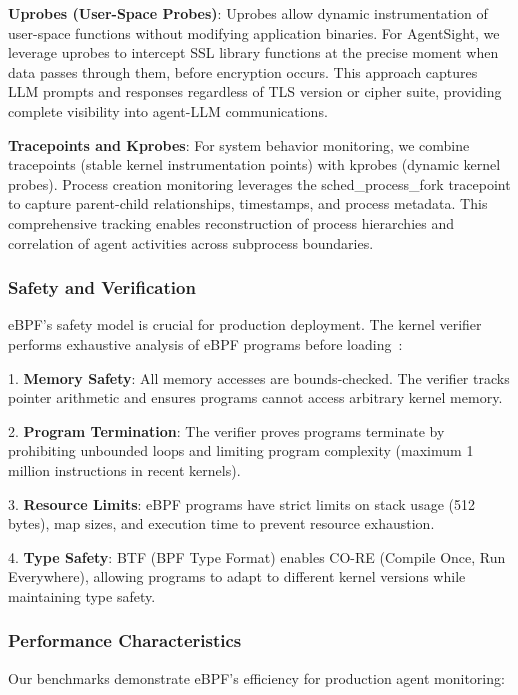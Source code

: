 \documentclass[sigplan,screen，review,9pt]{acmart}
\begin{document}
\textbf{Uprobes (User-Space Probes)}: Uprobes allow dynamic instrumentation of user-space functions without modifying application binaries. For AgentSight, we leverage uprobes to intercept SSL library functions at the precise moment when data passes through them, before encryption occurs. This approach captures LLM prompts and responses regardless of TLS version or cipher suite, providing complete visibility into agent-LLM communications.

\textbf{Tracepoints and Kprobes}: For system behavior monitoring, we combine tracepoints (stable kernel instrumentation points) with kprobes (dynamic kernel probes). Process creation monitoring leverages the sched\_process\_fork tracepoint to capture parent-child relationships, timestamps, and process metadata. This comprehensive tracking enables reconstruction of process hierarchies and correlation of agent activities across subprocess boundaries.

\subsubsection{Safety and Verification}

eBPF's safety model is crucial for production deployment. The kernel verifier performs exhaustive analysis of eBPF programs before loading~\cite{kerneldoc}:

1. \textbf{Memory Safety}: All memory accesses are bounds-checked. The verifier tracks pointer arithmetic and ensures programs cannot access arbitrary kernel memory.

2. \textbf{Program Termination}: The verifier proves programs terminate by prohibiting unbounded loops and limiting program complexity (maximum 1 million instructions in recent kernels).

3. \textbf{Resource Limits}: eBPF programs have strict limits on stack usage (512 bytes), map sizes, and execution time to prevent resource exhaustion.

4. \textbf{Type Safety}: BTF (BPF Type Format) enables CO-RE (Compile Once, Run Everywhere), allowing programs to adapt to different kernel versions while maintaining type safety.

\subsubsection{Performance Characteristics}

Our benchmarks demonstrate eBPF's efficiency for production agent monitoring:
\end{document}
